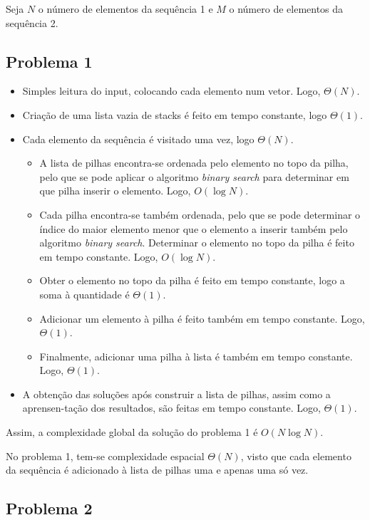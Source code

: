 \documentclass[12pt,a4paper]{article}
\begin{document}
  Seja $N$ o número de elementos da sequência 1 e $M$ o número de elementos da sequência 2.

  \subsection{Problema 1}

  \begin{itemize}
    \setlength{\itemsep}{0pt}
    \item Simples leitura do input, colocando cada elemento num vetor. Logo, $\Theta(N)$.
    \item Criação de uma lista vazia de stacks é feito em tempo constante, logo $\Theta(1)$.
    \item Cada elemento da sequência é visitado uma vez, logo $\Theta(N)$.
    \begin{itemize}
      \setlength{\itemsep}{0pt}
      \item A lista de pilhas encontra-se ordenada pelo elemento no topo da pilha, pelo que se pode aplicar o algoritmo \textit{binary search} para determinar em que pilha inserir o elemento. Logo, $O(\log N)$.
      \item Cada pilha encontra-se também ordenada, pelo que se pode determinar o índice do maior elemento menor que o elemento a inserir também pelo algoritmo \textit{binary search}. Determinar o elemento no topo da pilha é feito em tempo constante. Logo, $O(\log N)$.
      \item Obter o elemento no topo da pilha é feito em tempo constante, logo a soma à quantidade é $\Theta(1)$.
      \item Adicionar um elemento à pilha é feito também em tempo constante. Logo, $\Theta(1)$.
      \item Finalmente, adicionar uma pilha à lista é também em tempo constante. Logo, $\Theta(1)$.
    \end{itemize}
    \item A obtenção das soluções após construir a lista de pilhas, assim como a aprensen-tação dos resultados, são feitas em tempo constante. Logo, $\Theta(1)$.
  \end{itemize}

  Assim, a complexidade global da solução do problema 1 é $O(N \log N)$.

  No problema 1, tem-se complexidade espacial $\Theta(N)$, visto que cada elemento da sequência é adicionado à lista de pilhas uma e apenas uma só vez.

  \subsection{Problema 2}
\end{document}
